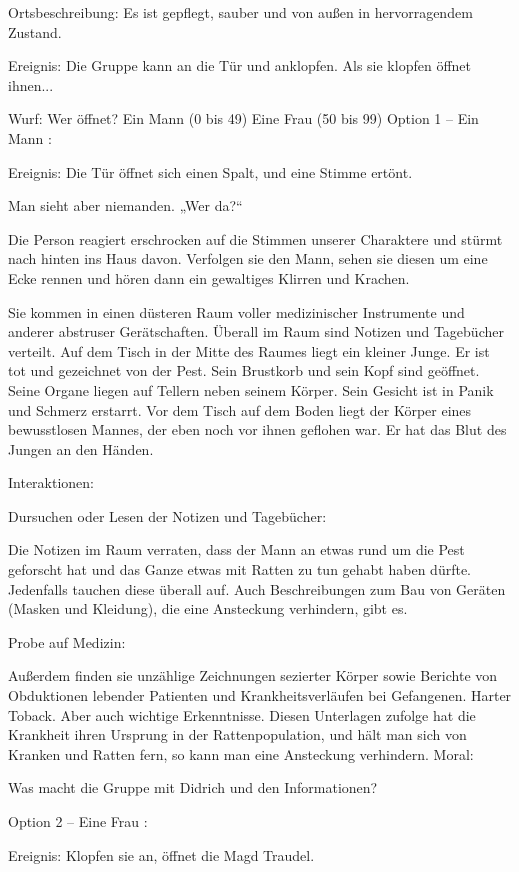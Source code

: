 Ortsbeschreibung: Es ist gepflegt, sauber und von außen in hervorragendem Zustand.

Ereignis: Die Gruppe kann an die Tür und anklopfen. Als sie klopfen öffnet ihnen...

Wurf: Wer öffnet?
Ein Mann (0 bis 49)
Eine Frau (50 bis 99)
Option 1 – Ein Mann
:

Ereignis: Die Tür öffnet sich einen Spalt, und eine Stimme ertönt.

Man sieht aber niemanden. „Wer da?“

Die Person reagiert erschrocken auf die Stimmen unserer Charaktere und stürmt nach hinten ins Haus davon. Verfolgen sie den Mann, sehen sie diesen um eine Ecke rennen und hören dann ein gewaltiges Klirren und Krachen.

Sie kommen in einen düsteren Raum voller medizinischer Instrumente und anderer abstruser Gerätschaften. Überall im Raum sind Notizen und Tagebücher verteilt. Auf dem Tisch in der Mitte des Raumes liegt ein kleiner Junge. Er ist tot und gezeichnet von der Pest. Sein Brustkorb und sein Kopf sind geöffnet. Seine Organe liegen auf Tellern neben seinem Körper. Sein Gesicht ist in Panik und Schmerz erstarrt. Vor dem Tisch auf dem Boden liegt der Körper eines bewusstlosen Mannes, der eben noch vor ihnen geflohen war. Er hat das Blut des Jungen an den Händen.

Interaktionen:

Dursuchen oder Lesen der Notizen und Tagebücher:

Die Notizen im Raum verraten, dass der Mann an etwas rund um die Pest geforscht hat und das Ganze etwas mit Ratten zu tun gehabt haben dürfte. Jedenfalls tauchen diese überall auf. Auch Beschreibungen zum Bau von Geräten (Masken und Kleidung), die eine Ansteckung verhindern, gibt es.

Probe auf Medizin:

Außerdem finden sie unzählige Zeichnungen sezierter Körper sowie Berichte von Obduktionen lebender Patienten und Krankheitsverläufen bei Gefangenen. Harter Toback. Aber auch wichtige Erkenntnisse. Diesen Unterlagen zufolge hat die Krankheit ihren Ursprung in der Rattenpopulation, und hält man sich von Kranken und Ratten fern, so kann man eine Ansteckung verhindern.
Moral:

Was macht die Gruppe mit Didrich und den Informationen?

Option 2 – Eine Frau
:

Ereignis: Klopfen sie an, öffnet die Magd Traudel.

